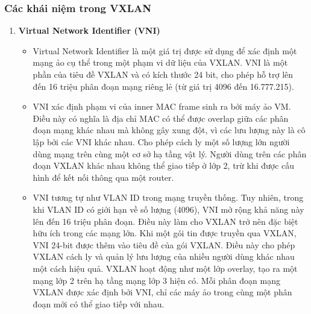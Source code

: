 \documentclass[13pt]{article}
\begin{document}
\subsubsection{Các khái niệm trong VXLAN}
\begin{enumerate}
    \item \textbf{Virtual Network Identifier (VNI)}
    \begin{itemize}
        \item Virtual Network Identifier là một giá trị được sử dụng để xác định một mạng ảo cụ thể trong một phạm vi dữ liệu của VXLAN. VNI là một phần của tiêu đề VXLAN và có kích thước 24 bit, cho phép hỗ trợ lên đến 16 triệu phân đoạn mạng riêng lẻ (từ giá trị 4096 đến 16.777.215).
        \item VNI xác định phạm vi của inner MAC frame sinh ra bởi máy ảo VM. Điều này có nghĩa là địa chỉ MAC có thể được overlap giữa các phân đoạn mạng khác nhau mà không gây xung đột, vì các lưu lượng này là cô lập bởi các VNI khác nhau. Cho phép cách ly một số lượng lớn người dùng mạng trên cùng một cơ sở hạ tầng vật lý. Người dùng trên các phân đoạn VXLAN khác nhau không thể giao tiếp ở lớp 2, trừ khi được cấu hình để kết nối thông qua một router.
        \item  VNI tương tự như VLAN ID trong mạng truyền thống. Tuy nhiên, trong khi VLAN ID có giới hạn về số lượng (4096), VNI mở rộng khả năng này lên đến 16 triệu phân đoạn. Điều này làm cho VXLAN trở nên đặc biệt hữu ích trong các mạng lớn. Khi một gói tin được truyền qua VXLAN, VNI 24-bit được thêm vào tiêu đề của gói VXLAN. Điều này cho phép VXLAN cách ly và quản lý lưu lượng của nhiều người dùng khác nhau một cách hiệu quả. VXLAN hoạt động như một lớp overlay, tạo ra một mạng lớp 2 trên hạ tầng mạng lớp 3 hiện có. Mỗi phân đoạn mạng VXLAN được xác định bởi VNI, chỉ các máy ảo trong cùng một phân đoạn mới có thể giao tiếp với nhau.
    \end{itemize}
    

\end{enumerate}
\end{document}

